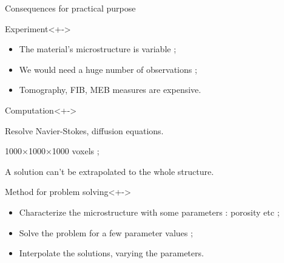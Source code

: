 \begin{frame}{Consequences for practical purpose}
%
\begin{block}{Experiment}<+->
\begin{itemize}
\item<+-> The material's microstructure is variable ;
\item<+-> We would need a huge number of observations ;
\item<+-> Tomography, FIB, MEB measures are expensive.
\end{itemize}
\end{block}
%
\begin{block}{Computation}<+->
\begin{description}
\item<+-> [Objectives] Resolve Navier-Stokes, diffusion equations.
\item<+-> [High spatial resolution] 1000$\times$1000$\times$1000 voxels ;
\item<+-> [Small sample] A solution can't be extrapolated to the whole structure.
\end{description}
\end{block}
%
\begin{block}{Method for problem solving}<+->
\begin{itemize}
\item<+-> Characterize the microstructure with some parameters : porosity etc ;
\item<+-> Solve the problem for a few parameter values ;
\item<+-> Interpolate the solutions, varying the parameters.
\end{itemize}
\end{block}
%
\end{frame}